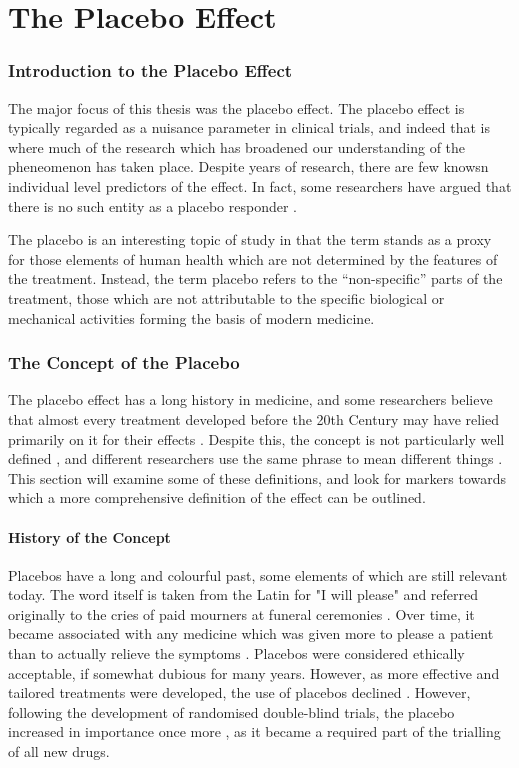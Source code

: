 \part{The Placebo Effect}

\section{Introduction to the Placebo Effect}
\label{sec:intr-plac-effect}

The major focus of this thesis was the placebo effect. The placebo effect is typically regarded as a nuisance parameter in clinical trials, and indeed that is where much of the research which has broadened our understanding of the pheneomenon has taken place. Despite years of research, there are few knowsn individual level predictors of the effect. In fact, some researchers have argued that there is no such entity as a placebo responder \cite{Kaptchuk2008a}. 

The placebo is an interesting topic of study in that the term stands as a proxy for those elements of human health which are not determined by the features of the treatment. Instead, the term placebo refers to the ``non-specific'' parts of the treatment, those which are not attributable to the specific biological or mechanical activities forming the basis of modern medicine. 

\section{The Concept of the Placebo}
\label{sec:concept-placebo}
The placebo effect has a long history in medicine, and some researchers believe that almost every treatment developed before the 20th Century may have relied primarily on it for their effects \cite{Shapiro1997,Macedo2003}. Despite this, the concept is not particularly well defined , and different researchers use the same phrase to mean different things \cite{Ernst1995b,hrobjartsson1996uncontrollable} . This section will examine some of these definitions, and look for markers towards which  a more comprehensive definition of the effect can be outlined.  

\subsection{History of the Concept} 
\label{sec:history-concept}
Placebos have a long and colourful past, some elements of which are still relevant today. The word itself is taken from the Latin for "I will please" and referred originally to the cries of paid mourners at funeral ceremonies \cite{Macedo2003}. Over time, it became associated with any medicine which was given more to please a patient than to actually relieve the symptoms \cite{Kaptchuk1998} . Placebos were considered ethically acceptable, if somewhat dubious for many years. However, as more effective and tailored treatments were developed, the use of placebos declined .  However, following the development of randomised double-blind trials, the  placebo increased in importance once more \cite{Kaptchuk1998}, as it became a required part of the trialling of all new drugs.  

